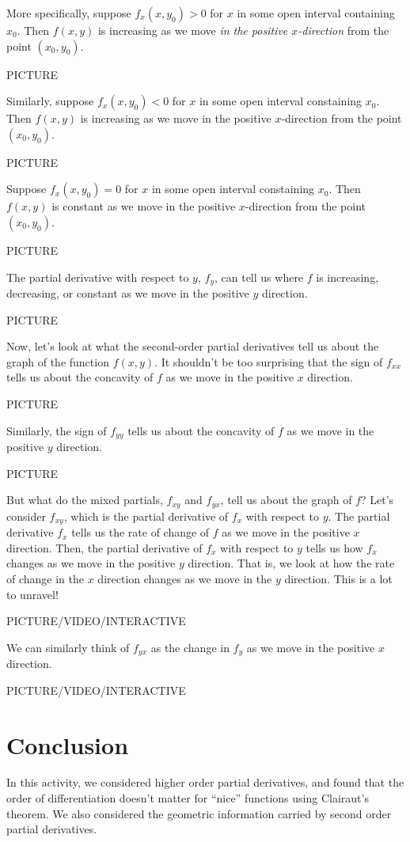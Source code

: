 \documentclass{ximera}
\begin{document}
More specifically, suppose $f_x(x,y_0)>0$ for $x$ in some open interval containing $x_0$. Then $f(x,y)$ is increasing as we move \emph{in the positive $x$-direction} from the point $(x_0,y_0)$.

PICTURE

Similarly, suppose $f_x(x,y_0)<0$ for $x$ in some open interval constaining $x_0$. Then $f(x,y)$ is increasing as we move in the positive $x$-direction from the point $(x_0,y_0)$.

PICTURE

Suppose $f_x(x,y_0)=0$ for $x$ in some open interval constaining $x_0$. Then $f(x,y)$ is constant as we move in the positive $x$-direction from the point $(x_0,y_0)$.

PICTURE

The partial derivative with respect to $y$, $f_y$, can tell us where $f$ is increasing, decreasing, or constant as we move in the positive $y$ direction.

PICTURE

Now, let's look at what the second-order partial derivatives tell us about the graph of the function $f(x,y)$. It shouldn't be too surprising that the sign of $f_{xx}$ tells us about the concavity of $f$ as we move in the positive $x$ direction.

PICTURE

Similarly, the sign of $f_{yy}$ tells us about the concavity of $f$ as we move in the positive $y$ direction.

PICTURE

But what do the mixed partials, $f_{xy}$ and $f_{yx}$, tell us about the graph of $f$? Let's consider $f_{xy}$, which is the partial derivative of $f_x$ with respect to $y$. The partial derivative $f_x$ tells us the rate of change of $f$ as we move in the positive $x$ direction. Then, the partial derivative of $f_x$ with respect to $y$ tells us how $f_x$ changes as we move in the positive $y$ direction. That is, we look at how the rate of change in the $x$ direction changes as we move in the $y$ direction. This is a lot to unravel!

PICTURE/VIDEO/INTERACTIVE

We can similarly think of $f_{yx}$ as the change in $f_y$ as we move in the positive $x$ direction.

PICTURE/VIDEO/INTERACTIVE

\section*{Conclusion}

In this activity, we considered higher order partial derivatives, and found that the order of differentiation doesn't matter for ``nice'' functions using Clairaut's theorem. We also considered the geometric information carried by second order partial derivatives.
\end{document}
